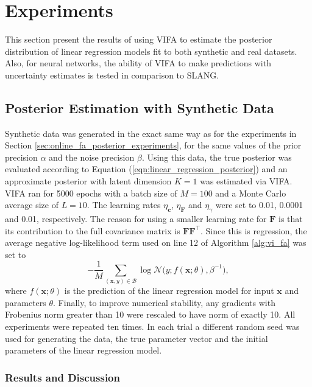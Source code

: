 \documentclass[msc,deptreport.inf]{infthesis} %
\newcommand{\matr}[1]{\mathbf{#1}}
\begin{document}
\section{Experiments}

This section present the results of using VIFA to estimate the posterior distribution of linear regression models fit to both synthetic and real datasets. Also, for neural networks, the ability of VIFA to make predictions with uncertainty estimates is tested in comparison to SLANG.

\subsection{Posterior Estimation with Synthetic Data}\label{sec:vifa_posterior_synthetic}

Synthetic data was generated in the exact same way as for the experiments in Section \ref{sec:online_fa_posterior_experiments}, for the same values of the prior precision $\alpha$ and the noise precision $\beta$. Using this data, the true posterior was evaluated according to Equation (\ref{eqn:linear_regression_posterior}) and an approximate posterior with latent dimension $K=1$ was estimated via VIFA. VIFA ran for 5000 epochs with a batch size of $M=100$ and a Monte Carlo average size of $L=10$.  The learning rates $\eta_\matr{c}$,  $\eta_\matr{F}$ and $\eta_\gamma$ were set to 0.01, 0.0001 and 0.01, respectively. The reason for using a smaller learning rate for $\matr{F}$ is that its contribution to the full covariance matrix is $\matr{F}\matr{F}^\intercal$. Since this is regression, the average negative log-likelihood term used on line 12 of Algorithm \ref{alg:vi_fa} was set to
\begin{equation}\label{eqn:vifa_log_likelihood_term}
	-\frac{1}{M} \sum_{(\matr{x}, y) \in \mathcal{B}} \log \mathcal{N}\big(y; f(\matr{x}; \theta), \beta^{-1}\big),
\end{equation}
where $f(\matr{x}; \theta)$ is the prediction of the linear regression model for input $\matr{x}$ and parameters $\theta$. Finally, to improve numerical stability, any gradients with Frobenius norm greater than 10 were rescaled to have norm of exactly 10. All experiments were repeated ten times. In each trial a different random seed was used for generating the data, the true parameter vector and the initial parameters of the linear regression model. 

\subsubsection{Results and Discussion}
\end{document}
